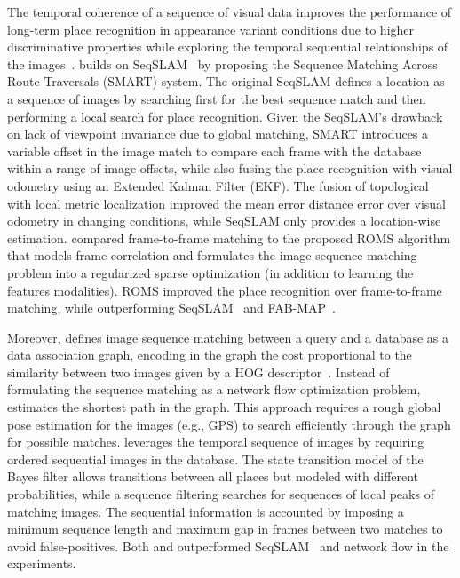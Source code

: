 The temporal coherence of a sequence of visual data improves the performance of long-term place recognition in appearance variant conditions due to higher discriminative properties while exploring the temporal sequential relationships of the images~\parencite{ouerghi-et-al:2018:s18040939,nguyen-et-al:2013:004}.
\cite{ouerghi-et-al:2018:s18040939} builds on SeqSLAM~\parencite{discussion:seqslam} by proposing the Sequence Matching Across Route Traversals (SMART) system. The original SeqSLAM defines a location as a sequence of images by searching first for the best sequence match and then performing a local search for place recognition. Given the SeqSLAM's drawback on lack of viewpoint invariance due to global matching, SMART introduces a variable offset in the image match to compare each frame with the database within a range of image offsets, while also fusing the place recognition with visual odometry using an Extended Kalman Filter (EKF). The fusion of topological with local metric localization improved the mean error distance error over visual odometry in changing conditions, while SeqSLAM only provides a location-wise estimation.
\cite{han-et-al:2018:3} compared frame-to-frame matching to the proposed ROMS algorithm that models frame correlation and formulates the image sequence matching problem into a regularized sparse optimization (in addition to learning the features modalities). ROMS improved the place recognition over frame-to-frame matching, while outperforming SeqSLAM~\parencite{discussion:seqslam} and FAB-MAP~\parencite{discussion:fab-map}.

Moreover, \cite{vysotska-et-al:2015:7139576} defines image sequence matching between a query and a database as a data association graph, encoding in the graph the cost proportional to the similarity between two images given by a HOG descriptor~\parencite{naseer-et-al:2015:7324181}. Instead of formulating the sequence matching as a network flow optimization problem, \cite{vysotska-et-al:2015:7139576} estimates the shortest path in the graph. This approach requires a rough global pose estimation for the images (e.g., GPS) to search efficiently through the graph for possible matches.
\cite{naseer-et-al:2015:7324181} leverages the temporal sequence of images by requiring ordered sequential images in the database. The state transition model of the Bayes filter allows transitions between all places but modeled with different probabilities, while a sequence filtering searches for sequences of local peaks of matching images. The sequential information is accounted by imposing a minimum sequence length and maximum gap in frames between two matches to avoid false-positives.
Both \cite{vysotska-et-al:2015:7139576} and \cite{naseer-et-al:2015:7324181} outperformed SeqSLAM~\parencite{discussion:seqslam} and network flow in the experiments.

